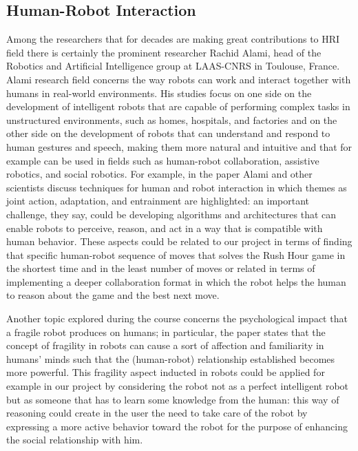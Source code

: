 \documentclass{article}
\begin{document}
\subsection{Human-Robot Interaction}
\indent Among the researchers that for decades are making great contributions to HRI field there is certainly the prominent researcher Rachid Alami, head of the Robotics and Artificial Intelligence group at LAAS-CNRS in Toulouse, France. Alami research field concerns the way robots can work and interact together with humans in real-world environments. His studies focus on one side on the development of intelligent robots that are capable of performing complex tasks in unstructured environments, such as homes, hospitals, and factories and on the other side on the development of robots that can understand and respond to human gestures and speech, making them more natural and intuitive and that for example can be used in fields such as human-robot collaboration, assistive robotics, and social robotics. For example, in the paper \cite{jointAction} %
Alami and other scientists discuss techniques for human and robot interaction in which themes as joint action, adaptation, and entrainment are highlighted: an important challenge, they say, could be developing algorithms and architectures that can enable robots to perceive, reason, and act in a way that is compatible with human behavior. These aspects could be related to our project in terms of finding that specific human-robot sequence of moves that solves the Rush Hour game in the shortest time and in the least number of moves or related in terms of implementing a deeper collaboration format in which the robot helps the human to reason about the game and the best next move.  

\indent Another topic explored during the course concerns the psychological impact that a fragile robot produces on humans; in particular, the paper \cite{matsumoto} %
states that the concept of fragility in robots can cause a sort of affection and familiarity in humans' minds such that the (human-robot) relationship established becomes more powerful. This fragility aspect inducted in robots could be applied for example in our project by considering the robot not as a perfect intelligent robot but as someone that has to learn some knowledge from the human: this way of reasoning could create in the user the need to take care of the robot by expressing a more active behavior toward the robot for the purpose of enhancing the social relationship with him.
\end{document}
